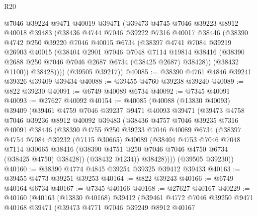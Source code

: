 \begin{lexlean}{R20}
\begin{coremodule}
{        @7046
        @39224
        @9471
        @40019
        @39471
        (@39473
          @4745
          @7046
          @39223
          @8912
          @40018
          @39483
          (@38436
            @4744
            @7046
            @39222
            @7316
            @40017
            @38446
            (@38390
              @4742
              @250
              @39220
              @7046
              @40015
              @6734
              (@38397
                @4741
                @7084
                @39219
                @26903
                @40015
                (@38404
                  @2901
                  @7046
                  @7048
                  @7114
                  @19814
                  @38416
                  (@38390 @2688 @250 @7046 @7046 @2687 @6734 (@38425 @2687) @38428))
                (@38432 @1100))
              @38428))))
      (@39505 @39217))
@40085 := @38390 @4761 @4846 @39241 @39326 @39409 @39434
@40088 := @39455 @4760 @39238 @39240
@40089 := @822 @39230
@40091 := @6749 @40089 @6734
@40092 := @7345 @40091
@40093 := @27627 @40092
@40154 := @40085
    (@40088
      (@13830 @40093)
      @39409
      (@39461
        @4759
        @7046
        @39237
        @9471
        @40093
        @39471
        (@39473
          @4758
          @7046
          @39236
          @8912
          @40092
          @39483
          (@38436
            @4757
            @7046
            @39235
            @7316
            @40091
            @38446
            (@38390
              @4755
              @250
              @39233
              @7046
              @40089
              @6734
              (@38397
                @4754
                @7084
                @39232
                (@7115 @30665)
                @40089
                (@38404
                  @4753
                  @7046
                  @7048
                  @7114
                  @30665
                  @38416
                  (@38390 @4751 @250 @7046 @7046 @4750 @6734 (@38425 @4750) @38428))
                (@38432 @1234))
              @38428))))
      (@39505 @39230))
@40160 := @38390 @4774 @4845 @39254 @39325 @39412 @39433
@40163 := @39455 @4773 @39251 @39253
@40164 := @822 @39243
@40166 := @6749 @40164 @6734
@40167 := @7345 @40166
@40168 := @27627 @40167
@40229 := @40160
    (@40163
      (@13830 @40168)
      @39412
      (@39461
        @4772
        @7046
        @39250
        @9471
        @40168
        @39471
        (@39473
          @4771
          @7046
          @39249
          @8912
          @40167
}
\end{coremodule}
\end{lexlean}
